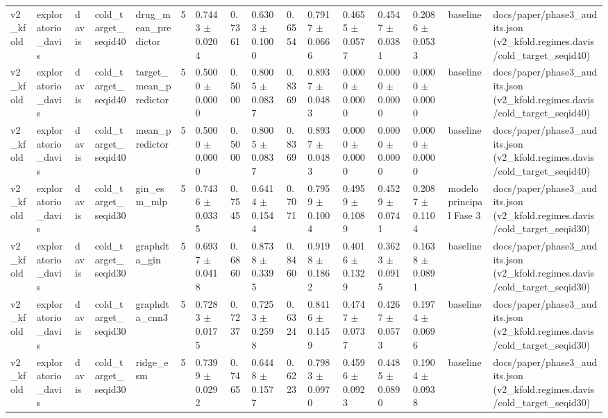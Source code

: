 \begin{table}[htbp]
\begin{tabular}{llllllllllllllll}
v2\_kfold & exploratorio\_davis & davis & cold\_target\_seqid40 & drug\_mean\_predictor & 5 & 0.7443 $\pm$ 0.0204 & 0.7361 & 0.6303 $\pm$ 0.1000 & 0.6554 & 0.7917 $\pm$ 0.0666 & 0.4655 $\pm$ 0.0577 & 0.4547 $\pm$ 0.0381 & 0.2086 $\pm$ 0.0533 & baseline & docs/paper/phase3\_audits.json (v2\_kfold.regimes.davis/cold\_target\_seqid40) \\
v2\_kfold & exploratorio\_davis & davis & cold\_target\_seqid40 & target\_mean\_predictor & 5 & 0.5000 $\pm$ 0.0000 & 0.5000 & 0.8005 $\pm$ 0.0837 & 0.8369 & 0.8937 $\pm$ 0.0483 & 0.0000 $\pm$ 0.0000 & 0.0000 $\pm$ 0.0000 & 0.0000 $\pm$ 0.0000 & baseline & docs/paper/phase3\_audits.json (v2\_kfold.regimes.davis/cold\_target\_seqid40) \\
v2\_kfold & exploratorio\_davis & davis & cold\_target\_seqid40 & mean\_predictor & 5 & 0.5000 $\pm$ 0.0000 & 0.5000 & 0.8005 $\pm$ 0.0837 & 0.8369 & 0.8937 $\pm$ 0.0483 & 0.0000 $\pm$ 0.0000 & 0.0000 $\pm$ 0.0000 & 0.0000 $\pm$ 0.0000 & baseline & docs/paper/phase3\_audits.json (v2\_kfold.regimes.davis/cold\_target\_seqid40) \\
v2\_kfold & exploratorio\_davis & davis & cold\_target\_seqid30 & gin\_esm\_mlp & 5 & 0.7436 $\pm$ 0.0335 & 0.7545 & 0.6414 $\pm$ 0.1544 & 0.7071 & 0.7959 $\pm$ 0.1004 & 0.4959 $\pm$ 0.1089 & 0.4529 $\pm$ 0.0741 & 0.2087 $\pm$ 0.1104 & modelo principal Fase 3 & docs/paper/phase3\_audits.json (v2\_kfold.regimes.davis/cold\_target\_seqid30) \\
v2\_kfold & exploratorio\_davis & davis & cold\_target\_seqid30 & graphdta\_gin & 5 & 0.6937 $\pm$ 0.0418 & 0.6860 & 0.8738 $\pm$ 0.3395 & 0.8460 & 0.9198 $\pm$ 0.1862 & 0.4016 $\pm$ 0.1329 & 0.3623 $\pm$ 0.0915 & 0.1638 $\pm$ 0.0891 & baseline & docs/paper/phase3\_audits.json (v2\_kfold.regimes.davis/cold\_target\_seqid30) \\
v2\_kfold & exploratorio\_davis & davis & cold\_target\_seqid30 & graphdta\_cnn3 & 5 & 0.7283 $\pm$ 0.0175 & 0.7237 & 0.7253 $\pm$ 0.2598 & 0.6324 & 0.8416 $\pm$ 0.1459 & 0.4747 $\pm$ 0.0737 & 0.4267 $\pm$ 0.0573 & 0.1974 $\pm$ 0.0696 & baseline & docs/paper/phase3\_audits.json (v2\_kfold.regimes.davis/cold\_target\_seqid30) \\
v2\_kfold & exploratorio\_davis & davis & cold\_target\_seqid30 & ridge\_esm & 5 & 0.7399 $\pm$ 0.0292 & 0.7465 & 0.6448 $\pm$ 0.1577 & 0.6223 & 0.7983 $\pm$ 0.0970 & 0.4596 $\pm$ 0.0923 & 0.4485 $\pm$ 0.0890 & 0.1904 $\pm$ 0.0938 & baseline & docs/paper/phase3\_audits.json (v2\_kfold.regimes.davis/cold\_target\_seqid30) \\

\end{tabular}
\end{table}
